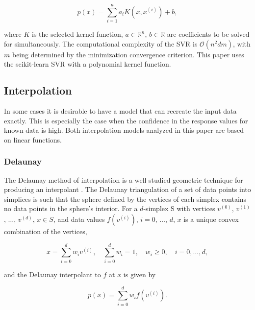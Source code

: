\documentclass{scspaperproc}
\theoremstyle{scsthe}
\begin{document}
$$ p(x)  = \sum_{i=1}^{n}a_i K(x,x^{(i)}) + b ,$$



where $K$ is the selected kernel function, $a \in \mathbb{R}^n$, $b
\in \mathbb{R}$ are coefficients to be solved for simultaneously. The
computational complexity of the SVR is $\mathcal{O}(n^2dm)$, with $m$
being determined by the minimization convergence criterion. This paper
uses the scikit-learn SVR  with a polynomial
kernel function.

\vspace{-10pt}
\subsection{Interpolation}
\vspace{-10pt}
In some cases it is desirable to have a model that can recreate the
input data exactly. This is especially the case when the confidence in
the response values for known data is high. Both interpolation models
analyzed in this paper are based on linear functions.

\vspace{-10pt}
\subsubsection{Delaunay}
\vspace{-10pt}
The Delaunay method of interpolation is a well studied geometric
technique for producing an interpolant . The
Delaunay triangulation of a set of data points into simplices is such
that the sphere defined by the vertices of each simplex contains no
data points in the sphere's interior. For a $d$-simplex S with
vertices $v^{(0)}$, $v^{(1)}$, $\ldots$, $v^{(d)}$, $x \in S$, and
data values $f(v^{(i)})$, $i=0$, $\ldots$, $d$, $x$ is a unique convex
combination of the vertices,

$$ x = \sum_{i=0}^{d} w_i v^{(i)}, \quad \sum_{i=0}^{d} w_i = 1, \quad
w_i \geq 0, \quad i=0,\ldots,d ,$$

and the Delaunay interpolant to $f$ at $x$ is given by

$$ p(x) = \sum_{i=0}^{d} w_i f(v^{(i)}). $$
\end{document}
